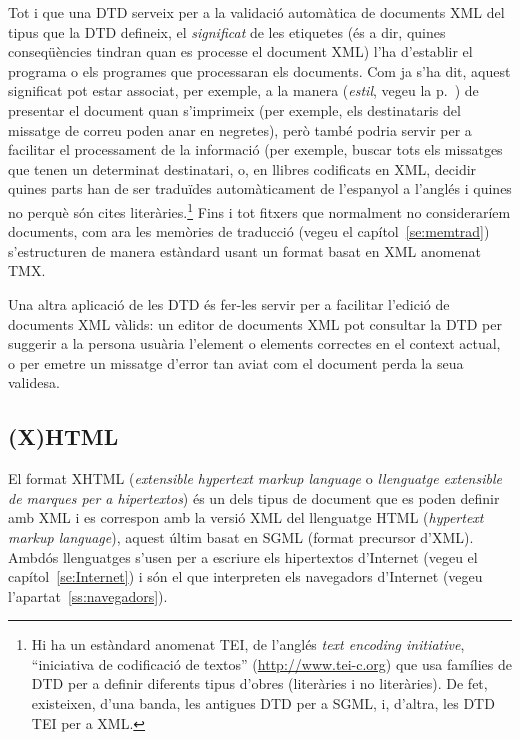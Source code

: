 Tot i que una DTD serveix per a la validació automàtica de documents
XML del tipus que la DTD defineix, el \emph{significat} de les
etiquetes (és a dir, quines conseqüències tindran quan es processe el
document XML) l'ha d'establir el programa o els programes que
processaran els documents.  Com ja s'ha dit, aquest significat pot
estar associat, per exemple, a la manera (\emph{estil}, vegeu la
p.~\pageref{pg:estil}) de presentar el document quan s'imprimeix (per
exemple, els destinataris del missatge de correu poden anar en
negretes), però també podria servir per a facilitar el processament de
la informació (per exemple, buscar tots els missatges que tenen un
determinat destinatari, o, en llibres codificats en XML, decidir
quines parts han de ser traduïdes automàticament de l'espanyol a
l'anglés i quines no perquè són cites literàries.\footnote{Hi ha un
  estàndard anomenat TEI, de l'anglés \emph{text encoding initiative},
  ``iniciativa de codificació de textos'' (\url{http://www.tei-c.org})
  que usa famílies de DTD per a definir diferents tipus d'obres
  (literàries i no literàries). De fet, existeixen, d'una banda, les
  antigues DTD per a SGML, i, d'altra, les DTD TEI per a XML.}  Fins i
tot fitxers que normalment no consideraríem documents, com ara les
memòries de traducció (vegeu el capítol~\ref{se:memtrad})
s'estructuren de manera estàndard usant un format basat en XML
anomenat TMX.

Una altra aplicació de les DTD és fer-les servir per a facilitar
l'edició de documents XML vàlids: un editor de documents XML pot
consultar la DTD per suggerir a la persona usuària l'element o
elements correctes en el context actual, o per emetre un missatge
d'error tan aviat com el document perda la seua validesa.

\subsection{(X)HTML}
\label{s3:HTML}

El format XHTML (\emph{extensible hypertext markup language} o
\emph{llenguatge extensible de marques per a hipertextos}) és un dels
tipus de document que es poden definir amb XML i es correspon amb la
versió XML del llenguatge HTML (\emph{hypertext markup language}),
aquest últim basat en SGML (format precursor d'XML). Ambdós
llenguatges s'usen per a escriure els hipertextos d'Internet (vegeu el
capítol~\ref{se:Internet}) i són el que interpreten els navegadors
d'Internet (vegeu l'apartat~\ref{ss:navegadors}).


